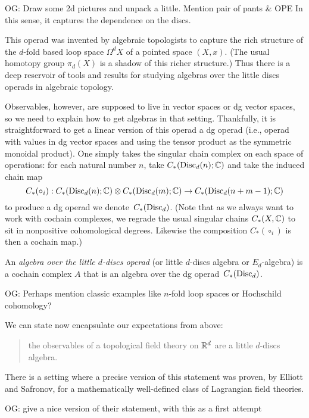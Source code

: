 \documentclass[11pt]{amsart}
\def\owen#1{{\textcolor{violet!65!black}{OG: {#1}}}}
\begin{document}
\owen{Draw some 2d pictures and unpack a little. Mention pair of pants \& OPE} 
In this sense, it captures the dependence on the discs.

This operad was invented by algebraic topologists to capture the rich structure of the $d$-fold based loop space $\Omega^d X$ of a pointed space $(X,x)$.
(The usual homotopy group $\pi_d(X)$ is a shadow of this richer structure.)
Thus there is a deep reservoir of tools and results for studying algebras over the little discs operads in algebraic topology.

Observables, however, are supposed to live in vector spaces or dg vector spaces,
so we need to explain how to get algebras in that setting.
Thankfully, it is straightforward to get a linear version of this operad a dg operad (i.e., operad with values in dg vector spaces and using the tensor product as the symmetric monoidal product).
One simply takes the singular chain complex on each space of operations:
for each natural number $n$, take $C_*({\rm Disc}_d(n); \mathbb C)$ and take the induced chain map 
\[
C_*(\circ_i): C_*({\rm Disc}_d(n); \mathbb C) \otimes C_*({\rm Disc}_d(m); \mathbb C) \to C_*({\rm Disc}_d(n+m-1); \mathbb C)
\]
to produce a dg operad we denote~$C_*({\rm Disc}_d)$.
(Note that as we always want to work with cochain complexes, we regrade the usual singular chains $C_*(X, \mathbb C)$ to sit in nonpositive cohomological degrees. 
Likewise the composition $C_*(\circ_i)$ is then a cochain map.)

\begin{dfn}
An {\em algebra over the little $d$-discs operad} (or little $d$-discs algebra or $E_d$-algebra) is a cochain complex $A$ that is an algebra over the dg operad~$C_*({\rm Disc}_d)$.
\end{dfn}

\owen{Perhaps mention classic examples like $n$-fold loop spaces or Hochschild cohomology?}

We can state now encapsulate our expectations from above:
\begin{quote}
the observables of a topological field theory on $\mathbb R^d$ are a little $d$-discs algebra.
\end{quote}
There is a setting where a precise version of this statement was proven, by Elliott and Safronov, for a mathematically well-defined class of Lagrangian field theories.

\owen{give a nice version of their statement, with this as a first attempt}
\end{document}
